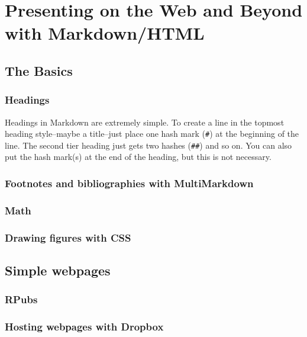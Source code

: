 



\chapter{Presenting on the Web and Beyond with Markdown/HTML}\label{MarkdownChapter}


\section{The Basics}

\subsection{Headings}

Headings in Markdown are extremely simple. To create a line in the topmost heading style--maybe a title--just place one hash mark (\verb|#|) at the beginning of the line. The second tier heading just gets two hashes (\verb|##|) and so on. You can also put the hash mark(s) at the end of the heading, but this is not necessary.

\subsection{Footnotes and bibliographies with MultiMarkdown}

\subsection{Math}

\subsection{Drawing figures with CSS}

\section{Simple webpages}

\subsection{RPubs}

\subsection{Hosting webpages with Dropbox}

